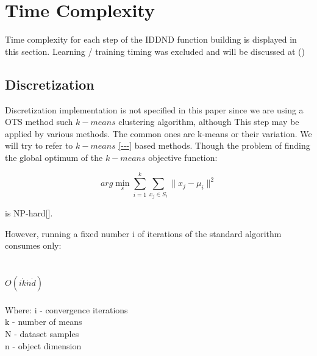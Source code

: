 
\chapter{Time Complexity} %

\label{Chapter5} %



Time complexity for each step of the IDDND function building is displayed in this section. 
Learning / training timing was excluded and will be discussed at ()


\section{Discretization}

	Discretization implementation is not specified in this paper since we are using a OTS method such $k-means$ clustering algorithm, although This step may be applied by various methods. 
	The common ones are k-means or their variation. We will try to refer to $k-means$ \ref{---} based methods.
	Though the problem of finding the global optimum of the $k-means$ objective function:
	
	\begin{equation}
	arg\min_s\sum_{i=1}^{k} \sum_{x_j \in S_i}^{}\|x_j - \mu_i \|^2
	\end{equation}
	
	is NP-hard[].
	
	However, running a fixed number i of iterations of the standard algorithm consumes only: \\ \\ \\
	\textbf{$O(i \dot k \dot n \dot d)$} \\ \\
	Where:
	i - convergence iterations \\
	k - number of means \\
	N - dataset samples \\
	n - object dimension \\
    
